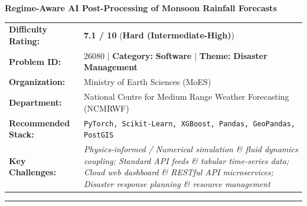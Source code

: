 \documentclass[10pt,a4paper]{article}
\begin{document}
\begin{tcolorbox}[pscard, title={"\textbf{SIH26080} \quad $\vert$ \quad Regime-Aware AI Post-Processing of Monsoon Rainfall Forecasts}]
\textbf{\large Regime-Aware AI Post-Processing of Monsoon Rainfall Forecasts}\\[0.25cm]

\begin{tabular}{@{}lp{12.5cm}@{}}
\textbf{Difficulty Rating:} & \textcolor{diffhard}{\textbf{\Large 7.1 / 10}} \quad (\textbf{Hard (Intermediate-High)}) \\
\textbf{Problem ID:} & 26080 \quad $\vert$ \quad \textbf{Category:} \textbf{Software} \quad $\vert$ \quad \textbf{Theme:} \textbf{Disaster Management} \\
\textbf{Organization:} & Ministry of Earth Sciences (MoES) \\
\textbf{Department:} & National Centre for Medium Range Weather Forecasting (NCMRWF) \\
\textbf{Recommended Stack:} & \texttt{PyTorch, Scikit-Learn, XGBoost, Pandas, GeoPandas, PostGIS} \\
\textbf{Key Challenges:} & \textit{\small Physics-informed / Numerical simulation \& fluid dynamics coupling; Standard API feeds \& tabular time-series data; Cloud web dashboard \& RESTful API microservices; Disaster response planning \& resource management} \\
\end{tabular}

\vspace{0.2cm}
\hrule
\vspace{0.2cm}


\end{tcolorbox}
\end{document}
